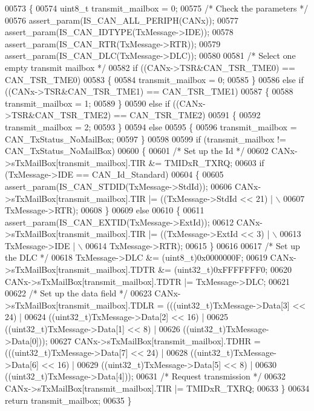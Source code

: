 \begin{DoxyCode}
00573 \{
00574   uint8\_t transmit\_mailbox = 0;
00575   \textcolor{comment}{/* Check the parameters */}
00576   assert_param(IS_CAN_ALL_PERIPH(CANx));
00577   assert_param(IS_CAN_IDTYPE(TxMessage->IDE));
00578   assert_param(IS_CAN_RTR(TxMessage->RTR));
00579   assert_param(IS_CAN_DLC(TxMessage->DLC));
00580 
00581   \textcolor{comment}{/* Select one empty transmit mailbox */}
00582   \textcolor{keywordflow}{if} ((CANx->TSR&CAN_TSR_TME0) == CAN_TSR_TME0)
00583   \{
00584     transmit\_mailbox = 0;
00585   \}
00586   \textcolor{keywordflow}{else} \textcolor{keywordflow}{if} ((CANx->TSR&CAN_TSR_TME1) == CAN_TSR_TME1)
00587   \{
00588     transmit\_mailbox = 1;
00589   \}
00590   \textcolor{keywordflow}{else} \textcolor{keywordflow}{if} ((CANx->TSR&CAN_TSR_TME2) == CAN_TSR_TME2)
00591   \{
00592     transmit\_mailbox = 2;
00593   \}
00594   \textcolor{keywordflow}{else}
00595   \{
00596     transmit\_mailbox = CAN_TxStatus_NoMailBox;
00597   \}
00598 
00599   \textcolor{keywordflow}{if} (transmit\_mailbox != CAN_TxStatus_NoMailBox)
00600   \{
00601     \textcolor{comment}{/* Set up the Id */}
00602     CANx->sTxMailBox[transmit\_mailbox].TIR &= TMIDxR_TXRQ;
00603     \textcolor{keywordflow}{if} (TxMessage->IDE == CAN_Id_Standard)
00604     \{
00605       assert_param(IS_CAN_STDID(TxMessage->StdId));  
00606       CANx->sTxMailBox[transmit\_mailbox].TIR |= ((TxMessage->StdId << 21) | \(\backslash\)
00607                                                   TxMessage->RTR);
00608     \}
00609     \textcolor{keywordflow}{else}
00610     \{
00611       assert_param(IS_CAN_EXTID(TxMessage->ExtId));
00612       CANx->sTxMailBox[transmit\_mailbox].TIR |= ((TxMessage->ExtId << 3) | \(\backslash\)
00613                                                   TxMessage->IDE | \(\backslash\)
00614                                                   TxMessage->RTR);
00615     \}
00616     
00617     \textcolor{comment}{/* Set up the DLC */}
00618     TxMessage->DLC &= (uint8\_t)0x0000000F;
00619     CANx->sTxMailBox[transmit\_mailbox].TDTR &= (uint32\_t)0xFFFFFFF0;
00620     CANx->sTxMailBox[transmit\_mailbox].TDTR |= TxMessage->DLC;
00621 
00622     \textcolor{comment}{/* Set up the data field */}
00623     CANx->sTxMailBox[transmit\_mailbox].TDLR = (((uint32\_t)TxMessage->Data[3] << 24) | 
00624                                              ((uint32\_t)TxMessage->Data[2] << 16) |
00625                                              ((uint32\_t)TxMessage->Data[1] << 8) | 
00626                                              ((uint32\_t)TxMessage->Data[0]));
00627     CANx->sTxMailBox[transmit\_mailbox].TDHR = (((uint32\_t)TxMessage->Data[7] << 24) | 
00628                                              ((uint32\_t)TxMessage->Data[6] << 16) |
00629                                              ((uint32\_t)TxMessage->Data[5] << 8) |
00630                                              ((uint32\_t)TxMessage->Data[4]));
00631     \textcolor{comment}{/* Request transmission */}
00632     CANx->sTxMailBox[transmit\_mailbox].TIR |= TMIDxR_TXRQ;
00633   \}
00634   \textcolor{keywordflow}{return} transmit\_mailbox;
00635 \}
\end{DoxyCode}
